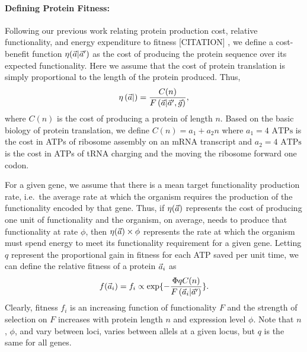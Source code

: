 \paragraph*{Defining Protein Fitness:} 
Following our previous work relating protein production cost, relative functionality, and energy expenditure to fitness [CITATION] \cite{Gilchrist2007,ShahAndGilchrist11}, we define a cost-benefit function $\eta(\vec{a}|\vec{a}^\prime)$ as the cost of producing the protein sequence \avec over its expected functionality.
Here we assume that the cost of protein translation is simply proportional to the length of the protein produced.
Thus,
\begin{equation}
\label{eq:etadef}
\eta\left(\vec{a} |\right) = \frac{C(n)}{F\left(\vec{a} | \vec{a}^\prime,\vec{g}\right)},
\end{equation}
where $C(n)$ is the cost of producing a protein of length $n$.
Based on the basic biology of protein translation, we define $C(n) = a_1 + a_2 n $ where  $a_1 = 4\text{ ATPs}$ is the cost in ATPs of ribosome assembly on an mRNA transcript and $a_2 = 4 \text{ ATPs}$ is the cost in ATPs of tRNA charging and the moving the ribosome forward one codon.

For a given gene, we assume that there is a mean target functionality production rate, i.e.~the average rate at which the organism requires the production of the functionality encoded by that gene.
Thus, if $\eta(\vec{a})$ represents the cost of producing one unit of functionality and the organism, on average, needs to produce that functionality at rate $\phi$, then $\eta(\vec{a}) \times \phi$ represents the rate at which the organism must spend energy to meet its functionality requirement for a given gene.
Letting $q$ represent the proportional gain in fitness for each ATP saved per unit time, we can define the relative fitness of a protein $\vec{a}_i$ as
\[
f(\vec{a}_i) = f_i  \propto \exp\{-\frac{\Phi q C(n)}{F\left(\vec{a}_i\middle|\vec{a}^\prime\right)}\}.
\]
Clearly, fitness $f_i$ is an increasing function of functionality $F$ and the strength of selection on $F$ increases with protein length $n$ and expression level $\phi$.
Note that $n$, $\phi$, and \avecopt vary between loci, \avec varies between allels at a given locus, but $q$ is the same for all genes.

